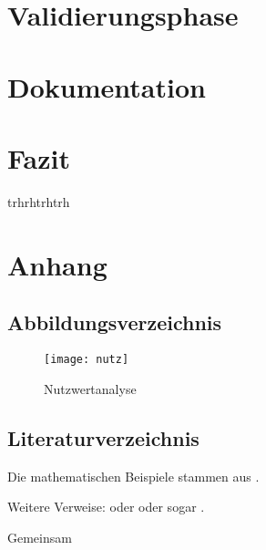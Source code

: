 \documentclass{article}
\begin{document}
\section{Validierungsphase}

\section{Dokumentation}

\section{Fazit}
trhrhtrhtrh
\linebreak
\linebreak
\linebreak
\linebreak
\linebreak
\linebreak
\linebreak
\linebreak


\section{Anhang}

\subsection{Abbildungsverzeichnis}
\begin{figure}
	\centering
	\texttt{[image: nutz]}
	\caption [Nutzwertanalyse]{Nutzwertanalyse}
	\label{fig:nutz}
\end{figure}

\subsection{Literaturverzeichnis}
Die mathematischen Beispiele stammen aus \autocite{Graham1995}.

Weitere Verweise: \parencite{Graham1995} oder \textcite{Thomas2008} oder sogar
.

\autocite[56]{Thomas2008}

\autocite[Siehe][45-48]{Graham1995}

Gemeinsam \autocite{Graham1995,Thomas2008}

\printbibliography
\end{document}
